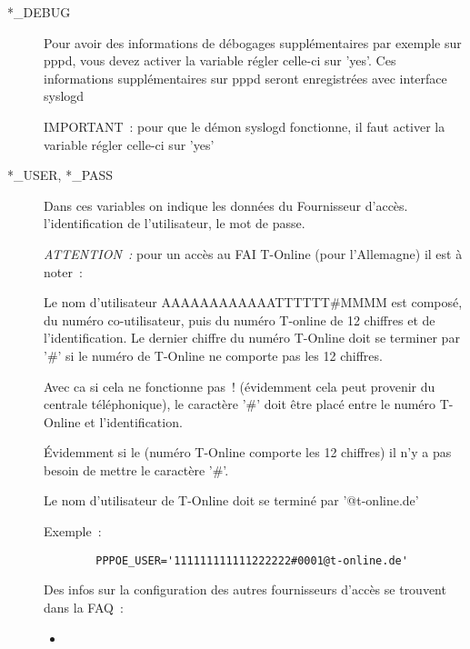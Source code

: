 \begin{description}
\item[*\_DEBUG]

Pour avoir des informations de débogages supplémentaires par exemple sur pppd,
vous devez activer la variable  régler celle-ci sur 'yes'.
Ces informations supplémentaires sur pppd seront enregistrées avec interface syslogd

IMPORTANT~: pour que le démon syslogd fonctionne, il faut activer la variable
 régler celle-ci sur 'yes'

\item[*\_USER, *\_PASS]

Dans ces variables on indique les données du Fournisseur d'accès.
 l'identification de l'utilisateur,  le mot de passe.

\emph{ATTENTION~:} pour un accès au FAI T-Online (pour l'Allemagne) il est à noter~:

Le nom d'utilisateur AAAAAAAAAAAATTTTTT\#MMMM est composé, du numéro
co-utilisateur, puis du numéro T-online de 12 chiffres et de
l'identification. Le dernier chiffre du numéro T-Online doit se terminer
par '\#' si le numéro de T-Online ne comporte pas les 12 chiffres.

Avec ca si cela ne fonctionne pas~! (évidemment cela peut provenir du centrale
téléphonique), le caractère '\#' doit être placé entre le numéro T-Online
et l'identification.

Évidemment si le (numéro T-Online comporte les 12 chiffres) il n'y a pas
besoin de mettre le caractère '\#'.

Le nom d'utilisateur de T-Online doit se terminé par '@t-online.de'

Exemple~:

\begin{example}
\begin{verbatim}
        PPPOE_USER='111111111111222222#0001@t-online.de'
\end{verbatim}
\end{example}

Des infos sur la configuration des autres fournisseurs d'accès se
trouvent dans la FAQ~:
\begin{itemize}
\item {}
\end{itemize}


\end{description}
